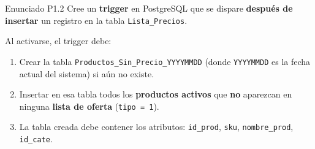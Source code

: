 \documentclass[12pt,a4paper]{article}
\begin{document}
\begin{enunciadobox}{Enunciado P1.2}
Cree un \textbf{trigger} en PostgreSQL que se dispare \textbf{después de
insertar} un registro en la tabla \texttt{Lista\_Precios}.

Al activarse, el trigger debe:
\begin{enumerate}[leftmargin=2em,itemsep=2pt]
  \item Crear la tabla \texttt{Productos\_Sin\_Precio\_YYYYMMDD}
        (donde \texttt{YYYYMMDD} es la fecha actual del sistema) si aún
        no existe.
  \item Insertar en esa tabla todos los \textbf{productos activos}
        que \textbf{no} aparezcan en ninguna \textbf{lista de oferta}
        (\texttt{tipo = 1}).
  \item La tabla creada debe contener los atributos: \texttt{id\_prod},
        \texttt{sku}, \texttt{nombre\_prod}, \texttt{id\_cate}.
\end{enumerate}
\end{enunciadobox}

\vspace{0.4cm}
\end{document}
